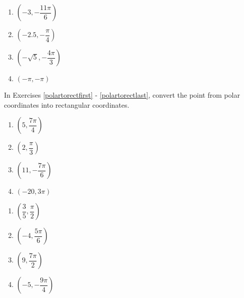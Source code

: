 \documentclass{ximera}
\begin{document}
\begin{multicols}{4} 

\begin{enumerate}

\setcounter{enumi}{\value{HW}}

\item $\left( -3, -\dfrac{11\pi}{6} \right)$
\item $\left( -2.5, -\dfrac{\pi}{4} \right)$ 
\item $\left( -\sqrt{5}, -\dfrac{4\pi}{3} \right)$
\item $\left( -\pi, -\pi \right)$  \label{polarpointgraphlast}

\setcounter{HW}{\value{enumi}}

\end{enumerate}

\end{multicols}

In Exercises \ref{polartorectfirst} - \ref{polartorectlast}, convert the point from polar coordinates into rectangular coordinates.  

\begin{multicols}{4}

\begin{enumerate}

\setcounter{enumi}{\value{HW}}

\item $\left( 5, \dfrac{7\pi}{4} \right)$ \label{polartorectfirst} 
\item $\left( 2, \dfrac{\pi}{3} \right)$ 
\item $\left( 11, -\dfrac{7\pi}{6} \right)$
\item $\left( -20, 3\pi \right)$ 

\setcounter{HW}{\value{enumi}}

\end{enumerate}

\end{multicols}

\begin{multicols}{4} 

\begin{enumerate}

\setcounter{enumi}{\value{HW}}

\item $\left( \dfrac{3}{5}, \dfrac{\pi}{2} \right)$
\item $\left( -4, \dfrac{5\pi}{6} \right)$
\item $\left( 9, \dfrac{7\pi}{2} \right)$
\item $\left( -5, -\dfrac{9\pi}{4} \right)$

\setcounter{HW}{\value{enumi}}

\end{enumerate}

\end{multicols}
\end{document}
